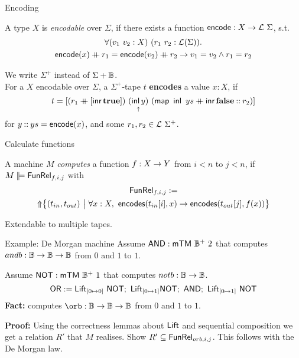 \begin{frame}{Encoding}
  \begin{definition}
    A type $X$ is \emph{encodable} over $\Sigma$, if there exists a function $\textsf{encode} : X \rightarrow \mathcal{L}~\Sigma$, s.t.
    \begin{multline*}
      \forall (v_1~v_2:X)~(r_1~r_2: \mathcal{L}(\Sigma)). \\
      \textsf{encode}(x) \mathbin{+\mkern-10mu+} r_1 = \textsf{encode}(v_2) \mathbin{+\mkern-10mu+} r_2 \rightarrow
      v_1 = v_2 \land r_1 = r_2
    \end{multline*}
  \end{definition}
  \pause%
  \begin{definition}
    We write $\Sigma^+$ instead of $\Sigma + \mathbb{B}$. \\
    For a $X$ encodable over $\Sigma$, a $\Sigma^+$-tape $t$ \textbf{encodes} a value $x:X$, if
    \[t = [ (r_1 \mathbin{+\mkern-10mu+} [\operatorname{\textsf{inr}} \mathbf{true}])~\underset{\uparrow}{(\operatorname{\textsf{inl}} y)}~(\textsf{map}~\operatorname{\textsf{inl}}~ys \mathbin{+\mkern-10mu+} \operatorname{\textsf{inr}} \mathbf{false} \mathbin{::} r_2) ]\]
    for $y \mathbin{::} ys = \textsf{encode}(x)$, and some $r_1, r_2 \in \mathcal{L}~\Sigma^+$.
  \end{definition}
\end{frame}

\begin{frame}{Calculate functions}
  \begin{definition}
    A machine $M$ \emph{computes} a function $f : X \rightarrow Y$ from $i < n$ to $j < n$, if $M \VDash \MS{FunRel}_{f,i,j}$ with
    \begin{multline*}
      \textsf{FunRel}_{f,i,j} := \\
      \operatorname{\Uparrow} \bigl\{ (t_{in}, t_{out})~\big|~
      \forall x:X,~ \textsf{encodes}(t_{in}[i], x) \rightarrow \textsf{encodes}(t_{out}[j], f(x)) \bigr \}
    \end{multline*}
  \end{definition}
  \pause%
  Extendable to multiple tapes.
\end{frame}

\begin{frame}{Example: De Morgan machine}
  Assume $\textsf{AND} : \textsf{mTM}~\mathbb{B}^+~2$ that computes $andb : \mathbb{B} \rightarrow \mathbb{B} \rightarrow \mathbb{B}$ from $0$ and $1$ to $1$.

  Assume $\textsf{NOT} : \textsf{mTM}~\mathbb{B}^+~1$ that computes $notb : \mathbb{B} \rightarrow \mathbb{B}$.
  \[
    \textsf{OR} := \textsf{Lift}_{[0 \mapsto 0]}~\textsf{NOT} ;~ \textsf{Lift}_{[0 \mapsto 1]} \textsf{NOT} ;~ \textsf{AND} ;~ \textsf{Lift}_{[0 \mapsto 1]}~\textsf{NOT}
  \]
  \pause%
  \textbf{Fact:}  computes $\orb \from \Bool \to \Bool \to \Bool$ from $0$ and $1$ to $1$.

  \textbf{Proof:}
  Using the correctness lemmas about $\textsf{Lift}$ and sequential composition we get a relation $R'$ that $M$ realises.
  Show $R' \subseteq \textsf{FunRel}_{orb,i,j}$.
  This follows with the De Morgan law.
\end{frame}

